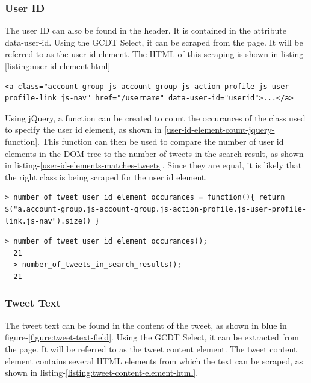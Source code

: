 \subsubsection{User ID}
The user ID can also be found in the header. It is contained in the attribute data-user-id. Using the GCDT Select, it can be scraped from the page. It will be referred to as the user id element. The HTML of this scraping is shown in listing-\ref{listing:user-id-element-html}

\begin{lstlisting}[caption={HTML of the user id element in a tweet},label={listing:user-id-element-html},captionpos=b]
  <a class="account-group js-account-group js-action-profile js-user-profile-link js-nav" href="/username" data-user-id="userid">...</a>
\end{lstlisting}

\noindent
Using jQuery, a function can be created to count the occurances of the class used to specify the user id element, as shown in \ref{user-id-element-count-jquery-function}. This function can then be used to compare the number of user id elements in the DOM tree to the number of tweets in the search result, as shown in listing-\ref{user-id-elements-matches-tweets}. Since they are equal, it is likely that the right class is being scraped for the user id element.

\begin{lstlisting}[caption={Creating a function in GCDT Javascript Console for counting the occurance of user id elements on the twitter search result page},label={user-id-element-count-jquery-function},captionpos=b]
  > number_of_tweet_user_id_element_occurances = function(){ return $("a.account-group.js-account-group.js-action-profile.js-user-profile-link.js-nav").size() }
\end{lstlisting}

\begin{lstlisting}[caption={Running functions in GCDT Javascript Console to show that the number of user id elements matches the number of tweets},label={user-id-elements-matches-tweets},captionpos=b]
  > number_of_tweet_user_id_element_occurances();
  21
  > number_of_tweets_in_search_results();
  21
\end{lstlisting}

\subsubsection{Tweet Text}
The tweet text can be found in the content of the tweet, as shown in blue in figure-\ref{figure:tweet-text-field}. Using the GCDT Select, it can be extracted from the page. It will be referred to as the tweet content element. The tweet content element contains several HTML elements from which the text can be scraped, as shown in listing-\ref{listing:tweet-content-element-html}.

